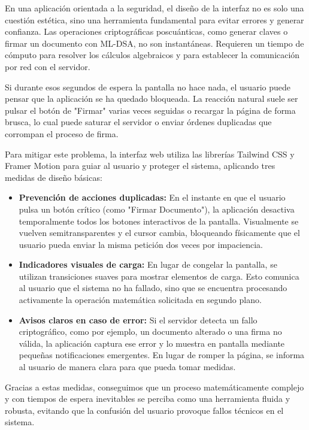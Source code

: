 \documentclass[11pt, a4paper]{report}
\theoremstyle{definition}
\begin{document}
En una aplicación orientada a la seguridad, el diseño de la interfaz no es solo una cuestión estética, sino una herramienta fundamental para evitar errores y generar confianza. Las operaciones criptográficas poscuánticas, como generar claves o firmar un documento con ML-DSA, no son instantáneas. Requieren un tiempo de cómputo para resolver los cálculos algebraicos y para establecer la comunicación por red con el servidor.

Si durante esos segundos de espera la pantalla no hace nada, el usuario puede pensar que la aplicación se ha quedado bloqueada. La reacción natural suele ser pulsar el botón de "Firmar" varias veces seguidas o recargar la página de forma brusca, lo cual puede saturar el servidor o enviar órdenes duplicadas que corrompan el proceso de firma.

Para mitigar este problema, la interfaz web utiliza las librerías Tailwind CSS y Framer Motion para guiar al usuario y proteger el sistema, aplicando tres medidas de diseño básicas:

\begin{itemize}
    \item \textbf{Prevención de acciones duplicadas:} En el instante en que el usuario pulsa un botón crítico (como "Firmar Documento"), la aplicación desactiva temporalmente todos los botones interactivos de la pantalla. Visualmente se vuelven semitransparentes y el cursor cambia, bloqueando físicamente que el usuario pueda enviar la misma petición dos veces por impaciencia.
    
    \item \textbf{Indicadores visuales de carga:} En lugar de congelar la pantalla, se utilizan transiciones suaves para mostrar elementos de carga. Esto comunica al usuario que el sistema no ha fallado, sino que se encuentra procesando activamente la operación matemática solicitada en segundo plano.
    
    \item \textbf{Avisos claros en caso de error:} Si el servidor detecta un fallo criptográfico, como por ejemplo, un documento alterado o una firma no válida, la aplicación captura ese error y lo muestra en pantalla mediante pequeñas notificaciones emergentes. En lugar de romper la página, se informa al usuario de manera clara para que pueda tomar medidas.
\end{itemize}

Gracias a estas medidas, conseguimos que un proceso matemáticamente complejo y con tiempos de espera inevitables se perciba como una herramienta fluida y robusta, evitando que la confusión del usuario provoque fallos técnicos en el sistema.
\end{document}

